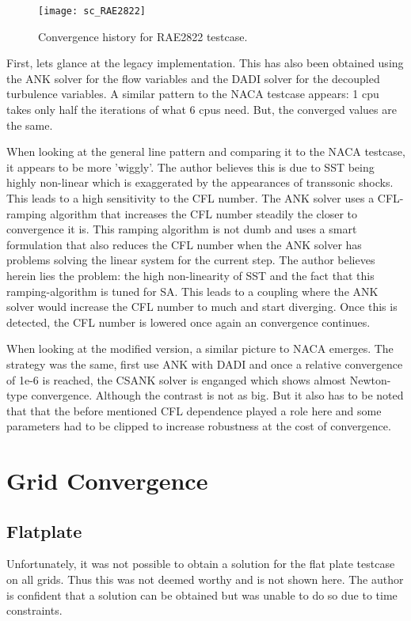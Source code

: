 \begin{figure}[H] \centering
    \texttt{[image: sc\_RAE2822]}
    \caption{Convergence history for RAE2822 testcase.}
    \label{fig:sc_RAE2822}
\end{figure}

\noindent First, lets glance at the legacy implementation. This has also been
obtained using the ANK solver for the flow variables and the DADI solver for
the decoupled turbulence variables. A similar pattern to the NACA testcase
appears: 1 cpu takes only half the iterations of what 6 cpus need. But, the
converged values are the same. 

When looking at the general line pattern and comparing it to the NACA testcase,
it appears to be more 'wiggly'. The author believes this is due to SST being
highly non-linear which is exaggerated by the appearances of transsonic shocks.
This leads to a high sensitivity to the CFL number. The ANK solver uses a
CFL-ramping algorithm that increases the CFL number steadily the closer to
convergence it is. This ramping algorithm is not dumb and uses a smart
formulation that also reduces the CFL number when the ANK solver has problems
solving the linear system for the current step. The author believes herein lies
the problem: the high non-linearity of SST and the fact that this
ramping-algorithm is tuned for SA. This leads to a coupling where the ANK
solver would increase the CFL number to much and start diverging. Once this is
detected, the CFL number is lowered once again an convergence continues. 

When looking at the modified version, a similar picture to NACA emerges. The
strategy was the same, first use ANK with DADI and once a relative convergence
of 1e-6 is reached, the CSANK solver is enganged which shows almost Newton-type
convergence. Although the contrast is not as big. But it also has to be noted
that that the before mentioned CFL dependence played a role here and some
parameters had to be clipped to increase robustness at the cost of convergence.








\section{Grid Convergence}
\subsection{Flatplate}
Unfortunately, it was not possible to obtain a solution for the flat plate
testcase on all grids. Thus this was not deemed worthy and is not shown here.
The author is confident that a solution can be obtained but was unable to do so
due to time constraints.

